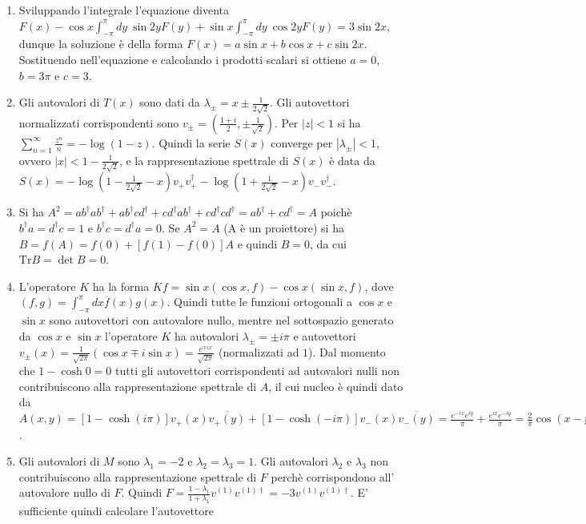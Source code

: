 \documentclass[a4paper,10pt]{article}
\begin{document}
\begin{enumerate}
\item Sviluppando l'integrale l'equazione diventa 
$F(x) - \cos x \int_{-\pi}^\pi dy \ \sin 2y F(y)
+ \sin x \int_{-\pi}^\pi dy \ \cos 2y F(y) = 3 \sin 2x$, dunque
la soluzione \`e della forma $F(x) = a \sin x + b \cos x + c \sin 2x$.
Sostituendo nell'equazione e calcolando i prodotti scalari si ottiene
$a=0$, $b=3\pi$ e $c=3$.
\item Gli autovalori di $T(x)$ sono dati da 
$\lambda_\pm = x \pm \frac{1}{2\sqrt{2}}$. Gli 
autovettori normalizzati corrispondenti  sono
$v_\pm = \left(\frac{1+i}{2},\pm \frac{1}{\sqrt{2}} \right)$.
Per $|z|<1$ si ha $\sum_{n=1}^\infty \frac{z^n}{n} = -\log (1-z)$. 
Quindi la serie $S(x)$ converge per $|\lambda_\pm|<1$, ovvero
$|x|<1-\frac{1}{2\sqrt{2}}$, e la rappresentazione
spettrale di $S(x)$ \`e data da
$S(x) = -\log(1 - \frac{1}{2\sqrt{2}} -x) v_+ v^\dag_+ -\log(1 + \frac{1}{2\sqrt{2}} -x) v_- v^\dag_-$.
\item Si ha $A^2 = ab^\dag ab^\dag + ab^\dag c d^\dag +
 c d^\dag ab^\dag+  c d^\dag  c d^\dag = a b^\dag + c d^\dag = A$
poich\`e $b^\dag a = d^\dag c = 1$ e $b^\dag c = d^\dag a = 0$.
Se $A^2 = A$ (A \`e un proiettore)  si ha $B = f(A) = f(0) + [f(1) - f(0)] A$ e quindi
$B = 0$, da cui $\text{Tr} B = \det B =0$.
\item L'operatore $K$ ha la forma 
$K f = \sin x (\cos x, f) - \cos x (\sin x,f)$, dove
$(f,g)=\int_{-\pi}^{\pi} dx \overline{f}(x) g(x)$.
Quindi tutte le funzioni ortogonali a $\cos x$ e $\sin x$ sono autovettori
con autovalore nullo, mentre nel sottospazio generato da
$\cos x$ e $\sin x$ l'operatore $K$ ha autovalori 
$\lambda_\pm = \pm i \pi$ e autovettori 
$v_\pm(x) = \frac{1}{\sqrt{2\pi}} (\cos x \mp i \sin x) =
\frac{e^{\mp i x}}{\sqrt{2\pi}} $
(normalizzati ad $1$).
Dal momento che $1-\cosh 0 = 0$ tutti gli autovettori
corrispondenti ad autovalori nulli non contribuiscono alla rappresentazione
spettrale di $A$, il cui nucleo \`e quindi dato da
$A(x,y) = [1-\cosh (i\pi)] v_+(x) \overline{v_+(y)}
 + [1-\cosh (-i\pi)]v_-(x) \overline{v_-(y)}
= \frac{e^{-ix}e^{iy}}{\pi} +  \frac{e^{ix}e^{-iy}}{\pi} =
\frac{2}{\pi} \cos(x-y) $.
\item Gli autovalori di $M$ sono $\lambda_1 = -2$ e $\lambda_2=\lambda_3=1$.
Gli autovalori $\lambda_2$ e $\lambda_3$ non contribuiscono alla 
rappresentazione spettrale di $F$ perch\`e corrispondono all' autovalore
nullo di $F$. Quindi $F = \frac{1-\lambda_1}{1+\lambda_1} v^{(1)} v^{(1)\dag} =
- 3   v^{(1)} v^{(1)\dag}$. E' sufficiente quindi calcolare l'autovettore 

\end{enumerate}
\end{document}
